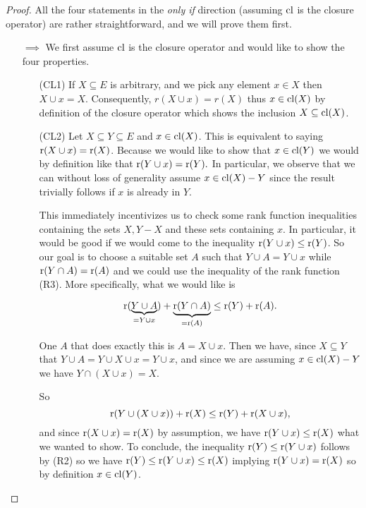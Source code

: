 \begin{proof}
    All the four statements in the \textit{only if} direction (assuming $\mathrm{cl}$ is the closure operator) are rather straightforward, and we will prove them first. 
    
    \begin{enumerate}
     
    \item[$\implies$]  
    We first assume $\mathrm{cl}$ is the closure operator and would like to show the four properties.
    
        \begin{enumerate}
            \item[(CL1)] If $X\subseteq E$ is arbitrary, and we pick any element $x \in X$ then $X \cup x = X$. Consequently, $r(X \cup x)= r(X)$ thus $x \in \mathrm{cl}(X)$ by definition of the closure operator which shows the inclusion $X \subseteq \mathrm{cl}(X)$.
    
            \item[(CL2)] Let $X \subseteq Y \subseteq E$
            and $x \in \mathrm{cl}(X)$. This is equivalent to saying $\operatorname{r}(X \cup x) = \operatorname{r}(X)$. Because we would like to show that $x \in \mathrm{cl}(Y)$ we would by definition like that $\operatorname{r}(Y \cup x) = \operatorname{r}(Y).$ In particular, we observe that we can without loss of generality assume $x \in \mathrm{cl}(X) - Y$ since the result trivially follows if $x$ is already in $Y$. 
            
            This immediately incentivizes us to check some rank function inequalities containing the sets $X, Y - X$ and these sets containing $x.$ In particular, it would be good if we would come to the inequality 
            $\operatorname{r}(Y\cup x) \leq \operatorname{r}(Y)$.
            So our goal is to choose a suitable set $A$ such that $Y \cup A = Y \cup x$ while $\operatorname{r}(Y \cap A) = \operatorname{r}(A)$ and we could use the inequality of the rank function (R3). More specifically, what we would like is
    
            $$\operatorname{r}(\underbrace{Y \cup A}_{ = Y  \cup x}) + \underbrace{\operatorname{r}(Y \cap A)}_{ = \operatorname{r}(A)} \leq \operatorname{r}(Y) + \operatorname{r}(A).$$
    
            One $A$ that does exactly this is $A = X \cup x.$ Then we have, since $X \subseteq Y$ that $Y \cup A = Y \cup X \cup x = Y \cup x$, and since we are assuming $x \in \mathrm{cl}(X) - Y$ we have $Y \cap (X \cup x) = X $.
    
            So $$\operatorname{r}(Y\cup (X \cup x)) + \operatorname{r}(X) \leq \operatorname{r}(Y) + \operatorname{r}(X \cup x),$$ and since $\operatorname{r}(X \cup x) = \operatorname{r}(X)$ by assumption, we have 
            $\operatorname{r}(Y \cup x)\leq \operatorname{r}(X)$ what we wanted to show. To conclude, the inequality $\operatorname{r}(Y) \leq \operatorname{r}(Y \cup x)$ follows by (R2) so we have $\operatorname{r}(Y) \leq \operatorname{r}(Y\cup x) \leq \operatorname{r}(X)$ implying $\operatorname{r}(Y \cup x ) = \operatorname{r}(X)$ so by definition $x \in \mathrm{cl}(Y)$.
    

\end{enumerate}
\end{enumerate}
\end{proof}
